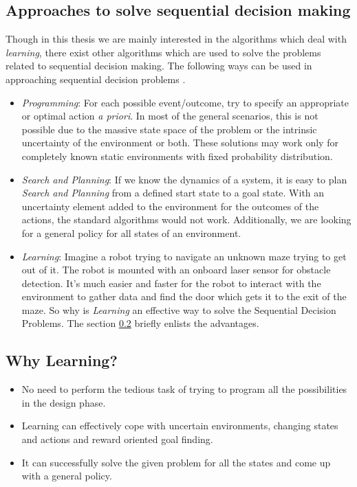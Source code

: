 \documentclass[12pt]{report}
\begin{document}
\subsection{Approaches to solve sequential decision making}
Though in this thesis we are mainly interested in the algorithms which deal with \textit{learning}, there exist other algorithms which are used to solve the problems related to sequential decision making. The following ways can be used in approaching sequential decision problems \cite{wiering2012reinforcement}. 
\begin{itemize}
\item \textit{Programming}: For each possible event/outcome, try to specify an appropriate or optimal action \textit{a priori}. In most of the general scenarios, this is not possible due to the massive state space of the problem or the intrinsic uncertainty of the environment or both. These solutions may work only for completely known static environments with fixed probability distribution. 

\item \textit{Search and Planning}: If we know the dynamics of a system, it is easy to plan \textit{Search and Planning} from a defined start state to a goal state. With an uncertainty element added to the environment for the outcomes of the actions, the standard algorithms would not work. Additionally, we are looking for a general policy for all states of an environment.

\item \textit{Learning}: Imagine a robot trying to navigate an unknown maze trying to get out of it. The robot is mounted with an onboard laser sensor for obstacle detection. It's much easier and faster for the robot to interact with the environment to gather data and find the door which gets it to the exit of the maze. So why is \textit{Learning} an effective way to solve the Sequential Decision Problems. The section \ref{whyLearning} briefly enlists the advantages.
\end{itemize}

\subsection{Why Learning?} \label{whyLearning}
\begin{itemize}
\item No need to perform the tedious task of trying to program all the possibilities in the design phase.
\item Learning can effectively cope with uncertain environments, changing states and actions and reward oriented goal finding.
\item It can successfully solve the given problem for all the states and come up with a general policy. 
\end{itemize}
\end{document}
